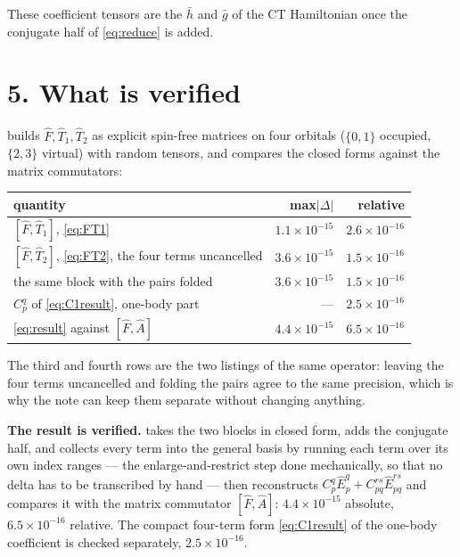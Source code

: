 \documentclass[11pt]{article}
\newcommand{\E}[2]{\hat E^{#1}_{#2}}
\begin{document}
\noindent
These coefficient tensors are the $\bar h$ and $\bar g$ of the CT Hamiltonian
once the conjugate half of \eqref{eq:reduce} is added.

\section*{5. What is verified}

 builds $\hat F,\hat T_1,\hat T_2$ as
explicit spin-free matrices on four orbitals ($\{0,1\}$ occupied, $\{2,3\}$
virtual) with random tensors, and compares the closed forms against the matrix
commutators:
\begin{center}
\footnotesize
\begin{tabular}{@{}lrr@{}}
\toprule
quantity & max$|\Delta|$ & relative \\
\midrule
$[\hat F,\hat T_1]$, \eqref{eq:FT1} & $1.1\times10^{-15}$ & $2.6\times10^{-16}$ \\
$[\hat F,\hat T_2]$, \eqref{eq:FT2}, the four terms uncancelled
  & $3.6\times10^{-15}$ & $1.5\times10^{-16}$ \\
the same block with the pairs folded & $3.6\times10^{-15}$ & $1.5\times10^{-16}$ \\
$C^q_p$ of \eqref{eq:C1result}, one-body part & --- & $2.5\times10^{-16}$ \\
\eqref{eq:result} against $[\hat F,\hat A]$ & $4.4\times10^{-15}$ & $6.5\times10^{-16}$ \\
\bottomrule
\end{tabular}
\end{center}

\noindent
The third and fourth rows are the two listings of the same operator: leaving the
four terms uncancelled and folding the pairs agree to the same precision, which
is why the note can keep them separate without changing anything.

\noindent
\textbf{The result is verified.}  takes the two
blocks in closed form, adds the conjugate half, and collects every term into the
general basis by running each term over its own index ranges --- the
enlarge-and-restrict step done mechanically, so that no delta has to be
transcribed by hand --- then reconstructs $C^q_p\E{q}{p}+C^{rs}_{pq}\E{rs}{pq}$
and compares it with the matrix commutator $[\hat F,\hat A]$:
$4.4\times10^{-15}$ absolute, $6.5\times10^{-16}$ relative. The compact
four-term form \eqref{eq:C1result} of the one-body coefficient is checked
separately, $2.5\times10^{-16}$.
\end{document}
